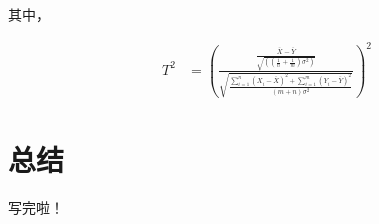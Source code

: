 \documentclass[a4paper,bachelor]{ructhesis}
\theoremstyle{definition}
\theoremstyle{definition}
\theoremstyle{definition}
\theoremstyle{remark}
\begin{document}
其中，

\[
\begin{aligned}
\quad T^2 
&=\left(\frac{\frac{\bar{X}-\bar{Y}}{\sqrt{((\frac{1}{n}+\frac{1}{m})\sigma^2)}}}{{\sqrt{\frac{\sum\limits_{i=1}^n(X_i-\bar{X})^2+\sum\limits_{i=1}^m(Y_i-\bar{Y})^2}{(m+n)\sigma^2}}}}\right)^2
\end{aligned}
\]

\chapter{总结}

写完啦！

\newpage

\autograph




\nocite{*}

\appendix



\end{document}
